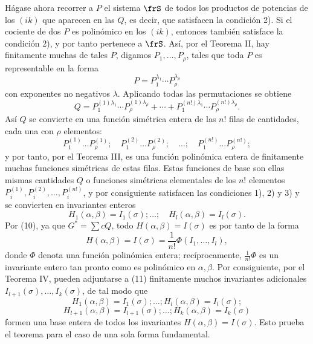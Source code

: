 \documentclass[11pt]{article}
\begin{document}
Hágase ahora recorrer a \(P\) el sistema \(\frS\) de todos los productos de potencias de los \((ik)\) que aparecen en las \(Q\), es decir, que satisfacen la condición 2). Si el cociente de dos \(P\) es polinómico en los \((ik)\), entonces también satisface la condición 2), y por tanto pertenece a \(\frS\). Así, por el Teorema II, hay finitamente muchas de tales \(P\), digamos \(P_1,\ldots,P_\rho\), tales que toda \(P\) es representable en la forma
\[
        P=P_1^{\lambda_1}\cdots P_\rho^{\lambda_\rho}
\]
con exponentes no negativos \(\lambda\). Aplicando todas las permutaciones se obtiene
\[
        Q=
        P_1^{(1)\lambda_1}\cdots P_\rho^{(1)\lambda_\rho}
        +\cdots+
        P_1^{(n!)\lambda_1}\cdots P_\rho^{(n!)\lambda_\rho}.
\]
Así \(Q\) se convierte en una función simétrica entera de las \(n!\) filas de cantidades, cada una con \(\rho\) elementos:
\[
        P_1^{(1)}\ldots P_\rho^{(1)};
        \quad
        P_1^{(2)}\ldots P_\rho^{(2)};
        \quad \ldots;\quad
        P_1^{(n!)}\ldots P_\rho^{(n!)};
\]
y por tanto, por el Teorema III, es una función polinómica entera de finitamente muchas funciones simétricas de estas filas. Estas funciones de base son ellas mismas cantidades \(Q\) o funciones simétricas elementales de los \(n!\) elementos \(P_i^{(1)},P_i^{(2)},\ldots,P_i^{(n!)}\), y por consiguiente satisfacen las condiciones 1), 2) y 3) y se convierten en invariantes enteros
\begin{equation}
        H_1(\alpha,\beta)=I_1(\sigma);\ldots;\quad
        H_l(\alpha,\beta)=I_l(\sigma).
\end{equation}
Por (10), ya que \(G^*=\sum cQ\), todo \(H(\alpha,\beta)=I(\sigma)\) es por tanto de la forma
\[
        H(\alpha,\beta)=I(\sigma)=\frac1{n!}\Phi(I_1,\ldots,I_l),
\]
donde \(\Phi\) denota una función polinómica entera; recíprocamente, \(\frac1{n!}\Phi\) es un invariante entero tan pronto como es polinómico en \(\alpha,\beta\). Por consiguiente, por el Teorema IV, pueden adjuntarse a (11) finitamente muchos invariantes adicionales \(I_{l+1}(\sigma),\ldots,I_k(\sigma)\), de tal modo que
\[
        H_1(\alpha,\beta)=I_1(\sigma);\ldots;H_l(\alpha,\beta)=I_l(\sigma);
\]
\[
        H_{l+1}(\alpha,\beta)=I_{l+1}(\sigma);\ldots;H_k(\alpha,\beta)=I_k(\sigma)
\]
formen una base entera de todos los invariantes \(H(\alpha,\beta)=I(\sigma)\). Esto prueba el teorema para el caso de una sola forma fundamental.
\end{document}
